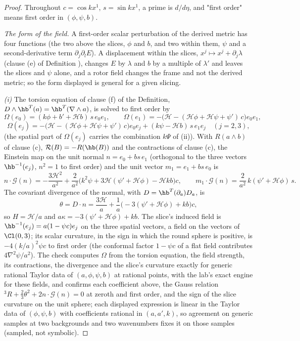 \begin{proof}
Throughout $c = \cos kx^{1}$, $s = \sin kx^{1}$, a prime is $d/d\eta$, and "first order" means first order in $(\phi, \psi, b)$.

\emph{The form of the field.} A first-order scalar perturbation of the derived metric has four functions (the two above the slices, $\phi$ and $b$, and two within them, $\psi$ and a second-derivative term $\partial_{j}\partial_{l}E$). A displacement within the slices, $x^{j} \mapsto x^{j} + \partial_{j}\lambda$ (clause (e) of Definition ), changes $E$ by $\lambda$ and $b$ by a multiple of $\lambda'$ and leaves the slices and $\psi$ alone, and a rotor field changes the frame and not the derived metric; so the form displayed is general for a given slicing.

\emph{(i)} The torsion equation of clause (f) of the Definition, $D\wedge\hb^{T}(a) = \hb^{T}(\nabla\wedge a)$, is solved to first order by
\[
\Omega(e_{0}) = (k\phi + b' + \mathcal{H}b)\,s\,e_{0}e_{1}, \qquad
\Omega(e_{1}) = -\bigl(\mathcal{H} - (\mathcal{H}\phi + \mathcal{H}\psi + \psi')\,c\bigr)e_{0}e_{1},
\]
\[
\Omega(e_{j}) = -\bigl(\mathcal{H} - (\mathcal{H}\phi + \mathcal{H}\psi + \psi')\,c\bigr)e_{0}e_{j} + (k\psi - \mathcal{H}b)\,s\,e_{1}e_{j} \quad (j = 2, 3),
\]
(the spatial part of $\Omega(e_{j})$ carries the combination $k\Psi$ of (ii)). With $R(a\wedge b)$ of clause (c), $\mathcal{R}(B) = -R(\hb(B))$ and the contractions of clause (c), the Einstein map on the unit normal $n = e_{0} + bs\,e_{1}$ (orthogonal to the three vectors $\hb^{-1}(e_{j})$, $n^{2} = 1$ to first order) and the unit vector $m_{1} = e_{1} + bs\,e_{0}$ is
\[
n\cdot\mathcal{G}(n) = -\frac{3\mathcal{H}^{2}}{a^{2}} + \frac{2}{a^{2}}\bigl(k^{2}\psi + 3\mathcal{H}(\psi' + \mathcal{H}\phi) - \mathcal{H}kb\bigr)c, \qquad
m_{1}\cdot\mathcal{G}(n) = \frac{2}{a^{2}}\,k(\psi' + \mathcal{H}\phi)\,s .
\]
The covariant divergence of the normal, with $D = \hb^{T}(\partial_{a})D_{a}$, is
\[
\theta = D\cdot n = \frac{3\mathcal{H}}{a} + \frac{1}{a}\bigl(-3(\psi' + \mathcal{H}\phi) + kb\bigr)c ,
\]
so $H = \mathcal{H}/a$ and $a\kappa = -3(\psi' + \mathcal{H}\phi) + kb$. The slice's induced field is $\hb^{-1}(e_{j}) = a(1 - \psi c)e_{j}$ on the three spatial vectors, a field on the vectors of $\Cl(0,3)$; its scalar curvature, in the sign in which the round sphere is positive, is $-4(k/a)^{2}\psi c$ to first order (the conformal factor $1 - \psi c$ of a flat field contributes $4\nabla^{2}\psi/a^{2}$). The check computes $\Omega$ from the torsion equation, the field strength, its contractions, the divergence and the slice's curvature exactly for generic rational Taylor data of $(a, \phi, \psi, b)$ at rational points, with the lab's exact engine for these fields, and confirms each coefficient above, the Gauss relation ${}^{3}R + \tfrac23\theta^{2} + 2n\cdot\mathcal{G}(n) = 0$ at zeroth and first order, and the sign of the slice curvature on the unit sphere; each displayed expression is linear in the Taylor data of $(\phi, \psi, b)$ with coefficients rational in $(a, a', k)$, so agreement on generic samples at two backgrounds and two wavenumbers fixes it on those samples (sampled, not symbolic).


\end{proof}
